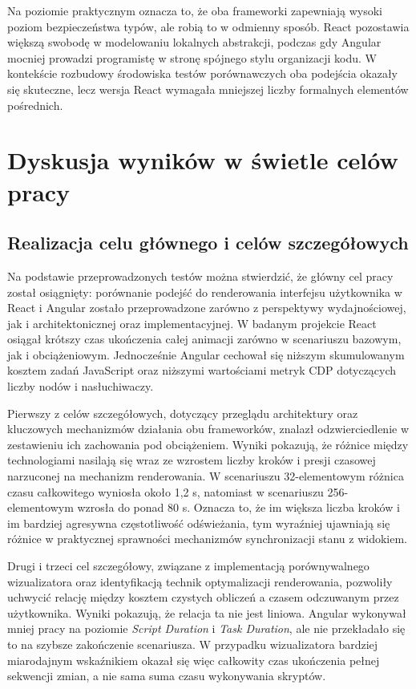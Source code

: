 \documentclass[12pt,openright,twoside]{report}
\begin{document}
Na poziomie praktycznym oznacza to, że oba frameworki zapewniają wysoki poziom bezpieczeństwa typów, ale robią to w odmienny sposób. React pozostawia większą swobodę w modelowaniu lokalnych abstrakcji, podczas gdy Angular mocniej prowadzi programistę w stronę spójnego stylu organizacji kodu. W kontekście rozbudowy środowiska testów porównawczych oba podejścia okazały się skuteczne, lecz wersja React wymagała mniejszej liczby formalnych elementów pośrednich.

\section{Dyskusja wyników w świetle celów pracy}

\subsection{Realizacja celu głównego i celów szczegółowych}
Na podstawie przeprowadzonych testów można stwierdzić, że główny cel pracy został osiągnięty: porównanie podejść do renderowania interfejsu użytkownika w React i Angular zostało przeprowadzone zarówno z perspektywy wydajnościowej, jak i architektonicznej oraz implementacyjnej. W badanym projekcie React osiągał krótszy czas ukończenia całej animacji zarówno w scenariuszu bazowym, jak i obciążeniowym. Jednocześnie Angular cechował się niższym skumulowanym kosztem zadań JavaScript oraz niższymi wartościami metryk CDP dotyczących liczby nodów i nasłuchiwaczy.

Pierwszy z celów szczegółowych, dotyczący przeglądu architektury oraz kluczowych mechanizmów działania obu frameworków, znalazł odzwierciedlenie w zestawieniu ich zachowania pod obciążeniem. Wyniki pokazują, że różnice między technologiami nasilają się wraz ze wzrostem liczby kroków i presji czasowej narzuconej na mechanizm renderowania. W scenariuszu 32-elementowym różnica czasu całkowitego wyniosła około 1,2 s, natomiast w scenariuszu 256-elementowym wzrosła do ponad 80 s. Oznacza to, że im większa liczba kroków i im bardziej agresywna częstotliwość odświeżania, tym wyraźniej ujawniają się różnice w praktycznej sprawności mechanizmów synchronizacji stanu z widokiem.

Drugi i trzeci cel szczegółowy, związane z implementacją porównywalnego wizualizatora oraz identyfikacją technik optymalizacji renderowania, pozwoliły uchwycić relację między kosztem czystych obliczeń a czasem odczuwanym przez użytkownika. Wyniki pokazują, że relacja ta nie jest liniowa. Angular wykonywał mniej pracy na poziomie \textit{Script Duration} i \textit{Task Duration}, ale nie przekładało się to na szybsze zakończenie scenariusza. W przypadku wizualizatora bardziej miarodajnym wskaźnikiem okazał się więc całkowity czas ukończenia pełnej sekwencji zmian, a nie sama suma czasu wykonywania skryptów.
\end{document}
